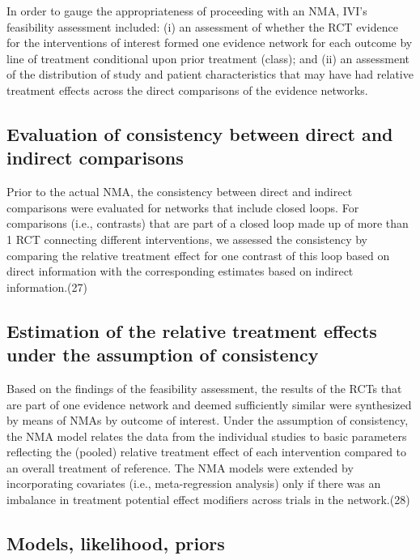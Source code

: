 \documentclass[11pt,final,fleqn]{article}\usepackage[]{graphicx}\usepackage[]{color}
\theoremstyle{plain}
\begin{document}
{\begin{appendices}
In order to gauge the appropriateness of proceeding with an NMA, IVI's feasibility assessment included: (i) an assessment of whether the RCT evidence for the interventions of interest formed one evidence network for each outcome by line of treatment conditional upon prior treatment (class); and (ii) an assessment of the distribution of study and patient characteristics that may have had relative treatment effects across the direct comparisons of the evidence networks.

\subsection{Evaluation of consistency between direct and indirect comparisons}

Prior to the actual NMA, the consistency between direct and indirect comparisons were evaluated for networks that include closed loops. For comparisons (i.e., contrasts) that are part of a closed loop made up of more than 1 RCT connecting different interventions, we assessed the consistency by comparing the relative treatment effect for one contrast of this loop based on direct information with the corresponding estimates based on indirect information.(27)  

\subsection{Estimation of the relative treatment effects under the assumption of consistency}

Based on the findings of the feasibility assessment, the results of the RCTs that are part of one evidence network and deemed sufficiently similar were synthesized by means of NMAs by outcome of interest. Under the assumption of consistency, the NMA model relates the data from the individual studies to basic parameters reflecting the (pooled) relative treatment effect of each intervention compared to an overall treatment of reference. The NMA models were extended by incorporating covariates (i.e., meta-regression analysis) only if there was an imbalance in treatment potential effect modifiers across trials in the network.(28)

\subsection{Models, likelihood, priors}


\end{appendices}}
\end{document}
